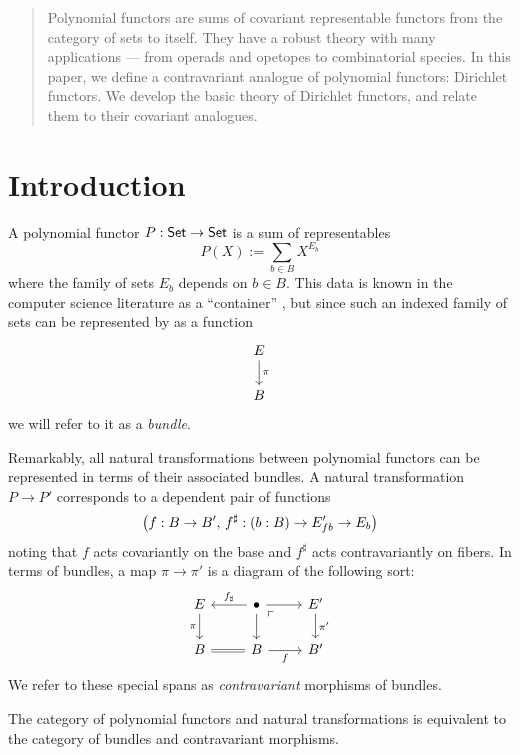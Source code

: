 
\begin{abstract}
  Polynomial functors are sums of covariant representable functors from the
  category of sets to itself. They have a robust theory with many applications
  --- from operads and opetopes to combinatorial species. In this paper, we
  define a contravariant analogue of polynomial functors: Dirichlet functors. We
  develop the basic theory of Dirichlet functors, and relate them to their
  covariant analogues.
\end{abstract}

\section{Introduction}
A polynomial functor $P : \operatorname{\mathsf{{Set}}} \to \operatorname{\mathsf{{Set}}}$ is a sum of representables
\begin{equation}\label{eqn.poly}
P(X) := \sum_{b \in B} X^{E_b}
\end{equation}
where the family of sets $E_b$ depends on $b\in B$. This data is known
in the computer science literature as a ``container'' \cites{abbott2003categories}{abbott2005containers}{abbot2003categoriesthesis}, but since such an indexed
family of sets can be represented by as a function
\[
  \begin{tikzcd}
    E \arrow[d, "\pi"] \\
    B
  \end{tikzcd}
\]
we will refer to it as a \emph{bundle}.

Remarkably, all natural transformations between polynomial functors can be
represented in terms of their associated bundles. A natural transformation $P
\to P'$ corresponds to a dependent pair of functions
\[
\left( f : B \to B',\, f^{\sharp} : ({b : B}) \to E'_{fb} \to E_b \right)
\]
noting that $f$ acts covariantly on the base and $f^\sharp$ acts contravariantly on
fibers. 
In terms of bundles, a map $\pi\to\pi'$ is a diagram of the following sort:
\[
  \begin{tikzcd}
    E \arrow[d, "\pi"'] \arrow[r, leftarrow, "f_{\sharp}"] & \bullet \arrow[d] \arrow[r]
    \arrow[dr, phantom, "\ulcorner" very near start] & E' \arrow[d, "\pi'"] \\
    B \arrow[r, equals] & B \arrow[r, "f"'] & B'
  \end{tikzcd}
\]
We refer to these special spans as \emph{contravariant} morphisms of bundles.

\begin{thm}
The category of polynomial functors and natural transformations is equivalent to
the category of bundles and contravariant morphisms.
\end{thm}

